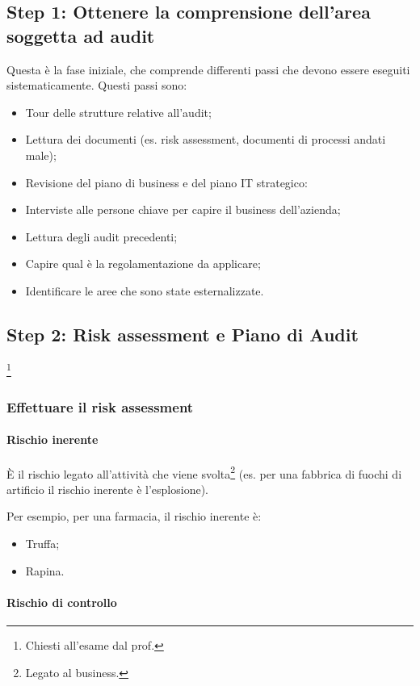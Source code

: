 \subsection{Step 1: Ottenere la comprensione dell'area soggetta ad audit}

Questa è la fase iniziale, che comprende differenti passi che devono essere
eseguiti sistematicamente.
Questi passi sono:
\begin{itemize}
\item Tour delle strutture relative all'audit;
\item Lettura dei documenti (es. risk assessment, documenti di processi andati
male);
\item Revisione del piano di business e del piano IT strategico:
\item Interviste alle persone chiave per capire il business dell'azienda;
\item Lettura degli audit precedenti;
\item Capire qual è la regolamentazione da applicare;
\item Identificare le aree che sono state esternalizzate.
\end{itemize}

\subsection{Step 2: Risk assessment e Piano di Audit}\footnote{Chiesti
all'esame dal prof.}

\subsubsection{Effettuare il risk assessment}

\paragraph*{Rischio inerente}

È il rischio legato all'attività che viene svolta\footnote{Legato al business.}
(es. per una fabbrica di fuochi di artificio il rischio inerente è
l'esplosione).

Per esempio, per una farmacia, il rischio inerente è:
\begin{itemize}
\item Truffa;
\item Rapina.
\end{itemize}

\paragraph*{Rischio di controllo}

